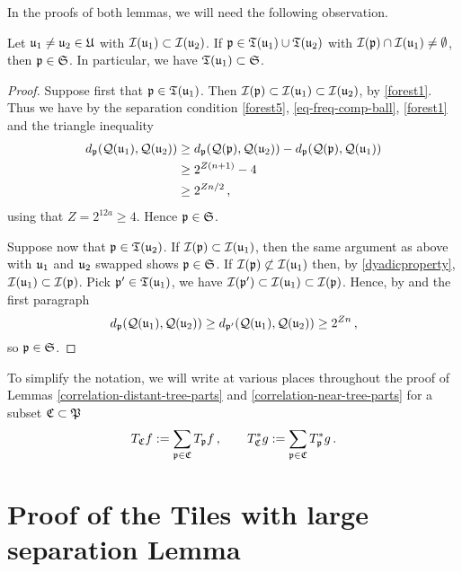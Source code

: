 In the proofs of both lemmas, we will need the following observation.

\begin{lemma}
    \label{overlap-implies-distance}
    \leanok
    Let ${\mathfrak u}_1 \ne {\mathfrak u}_2 \in {\mathfrak U}$ with ${\mathcal{I}}({\mathfrak u}_1) \subset {\mathcal{I}}({\mathfrak u}_2)$. If ${\mathfrak p} \in {\mathfrak T}({\mathfrak u}_1) \cup {\mathfrak T}({\mathfrak u}_2)$ with ${\mathcal{I}}({\mathfrak p}) \cap {\mathcal{I}}({\mathfrak u}_1) \ne \emptyset$, then ${\mathfrak p} \in \mathfrak{S}$. In particular, we have ${\mathfrak T}({\mathfrak u}_1) \subset \mathfrak{S}$.
\end{lemma}

\begin{proof}
    \leanok
    Suppose first that ${\mathfrak p} \in {\mathfrak T}({\mathfrak u}_1)$. Then ${\mathcal{I}}({\mathfrak p}) \subset {\mathcal{I}}({\mathfrak u}_1) \subset {\mathcal{I}}({\mathfrak u}_2)$, by \eqref{forest1}. Thus we have by the separation condition \eqref{forest5}, \eqref{eq-freq-comp-ball}, \eqref{forest1} and the triangle inequality
    \begin{align*}
        d_{{\mathfrak p}}({\mathcal{Q}}({\mathfrak u}_1), {\mathcal{Q}}({\mathfrak u}_2)) &\ge d_{{\mathfrak p}}({\mathcal{Q}}({\mathfrak p}), {\mathcal{Q}}({\mathfrak u}_2)) - d_{{\mathfrak p}}({\mathcal{Q}}({\mathfrak p}), {\mathcal{Q}}({\mathfrak u}_1))\\
        &\ge 2^{Z(n+1)} - 4\\
        &\ge 2^{Zn/2}\,,
    \end{align*}
    using that $Z= 2^{12a}\ge 4$. Hence ${\mathfrak p} \in \mathfrak{S}$.

    Suppose now that ${\mathfrak p} \in {\mathfrak T}({\mathfrak u}_2)$. If ${\mathcal{I}}({\mathfrak p}) \subset {\mathcal{I}}({\mathfrak u}_1)$, then the same argument as above with ${\mathfrak u}_1$ and ${\mathfrak u}_2$ swapped shows ${\mathfrak p} \in \mathfrak{S}$. If ${\mathcal{I}}({\mathfrak p}) \not \subset {\mathcal{I}}({\mathfrak u}_1)$ then, by \eqref{dyadicproperty}, ${\mathcal{I}}({\mathfrak u}_1) \subset {\mathcal{I}}({\mathfrak p})$. Pick ${\mathfrak p}' \in {\mathfrak T}({\mathfrak u}_1)$, we have ${\mathcal{I}}({\mathfrak p}') \subset {\mathcal{I}}({\mathfrak u}_1) \subset {\mathcal{I}}({\mathfrak p})$. Hence, by  and the first paragraph
    $$
        d_{{\mathfrak p}}({\mathcal{Q}}({\mathfrak u}_1), {\mathcal{Q}}({\mathfrak u}_2)) \ge d_{{\mathfrak p}'}({\mathcal{Q}}({\mathfrak u}_1), {\mathcal{Q}}({\mathfrak u}_2)) \ge 2^{Zn}\,,
    $$
    so ${\mathfrak p} \in \mathfrak{S}$.
\end{proof}

To simplify the notation, we will write at various places throughout the proof of Lemmas \ref{correlation-distant-tree-parts} and \ref{correlation-near-tree-parts} for a subset ${\mathfrak C} \subset {\mathfrak P}$
$$
    T_{{\mathfrak C}} f := \sum_{{\mathfrak p} \in {\mathfrak C}} T_{{\mathfrak p}} f\,, \quad\quad T_{{\mathfrak C}}^* g := \sum_{{\mathfrak p}\in{\mathfrak C}} T_{{\mathfrak p}}^* g\,.
$$

\section{Proof of the Tiles with large separation Lemma}
    \label{subsec-big-tiles}

